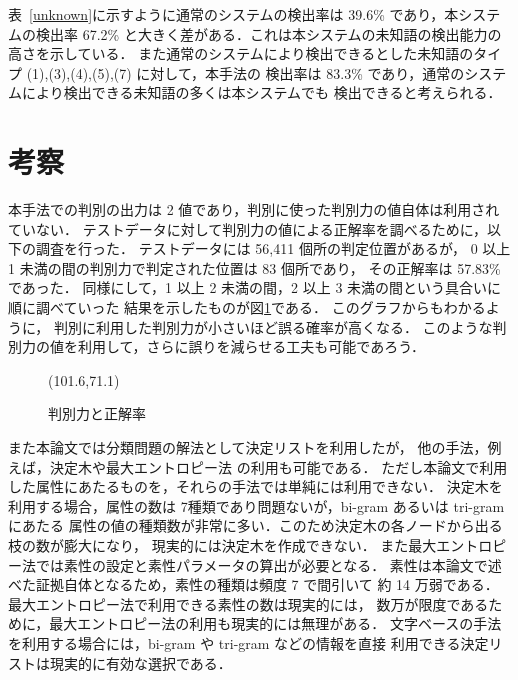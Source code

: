 \mbox{表 \ref{unknown}}に示すように通常のシステムの検出率は 39.6\% であり，本システムの検出率
67.2\% と大きく差がある．これは本システムの未知語の検出能力の高さを示している．
また通常のシステムにより検出できるとした未知語のタイプ (1),(3),(4),(5),(7) に対して，本手法の
検出率は 83.3\% であり，通常のシステムにより検出できる未知語の多くは本システムでも
検出できると考えられる．


\section{考察}


本手法での判別の出力は 2 値であり，判別に使った判別力の値自体は利用されていない．
テストデータに対して判別力の値による正解率を調べるために，以下の調査を行った．
テストデータには 56,411 個所の判定位置があるが，
0 以上 1 未満の間の判別力で判定された位置は 83 個所であり，
その正解率は 57.83\% であった．
同様にして，1 以上 2 未満の間，2 以上 3 未満の間という具合いに順に調べていった
結果を示したものが\mbox{図\ref{kousatu2}}である．
このグラフからもわかるように，
判別に利用した判別力が小さいほど誤る確率が高くなる．
このような判別力の値を利用して，さらに誤りを減らせる工夫も可能であろう．

\begin{figure}[htbp]
\begin{center}
\atari(101.6,71.1)
\end{center}
\caption{判別力と正解率}
\label{kousatu2}
\end{figure}

また本論文では分類問題の解法として決定リストを利用したが，
他の手法，例えば，決定木\cite{quinlan93}や最大エントロピー法\cite{ratnaparkhi98} の利用も可能である．
ただし本論文で利用した属性にあたるものを，それらの手法では単純には利用できない．
決定木を利用する場合，属性の数は 7種類であり問題ないが，bi-gram あるいは tri-gram にあたる
属性の値の種類数が非常に多い．このため決定木の各ノードから出る枝の数が膨大になり，
現実的には決定木を作成できない．
また最大エントロピー法では素性の設定と素性パラメータの算出が必要となる．
素性は本論文で述べた証拠自体となるため，素性の種類は頻度 7 で間引いて
約 14 万弱である．最大エントロピー法で利用できる素性の数は現実的には，
数万が限度であるために，最大エントロピー法の利用も現実的には無理がある．
文字ベースの手法を利用する場合には，bi-gram や tri-gram などの情報を直接
利用できる決定リストは現実的に有効な選択である．

